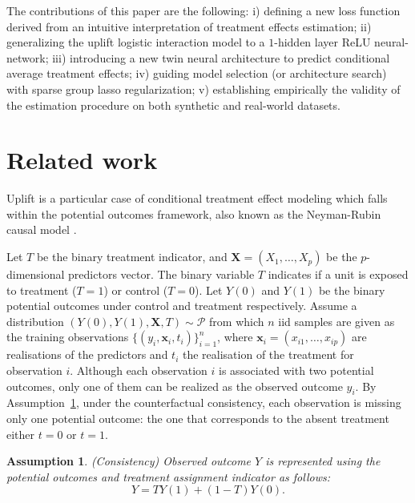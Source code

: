 \documentclass{article}
\def\x{\mathbf x}
\newtheorem{assumption}{Assumption}
\begin{document}
The contributions of this paper are the following: i) defining a new loss function derived from an intuitive interpretation of treatment effects estimation; ii) generalizing the uplift logistic interaction model to a $1$-hidden layer ReLU neural-network; iii) introducing a new twin neural architecture to predict conditional average treatment effects;  iv) guiding model selection (or architecture search) with sparse group lasso regularization; v) establishing empirically the validity of the estimation procedure on both synthetic and real-world datasets. %




\section{Related work}
\label{sec:notation}


Uplift is a particular case of conditional treatment effect modeling which falls within the potential outcomes framework, also known as the Neyman-Rubin causal model \citep{rubin1974estimating,rosenbaum1983central,holland1986statistics}.

Let $T$ be the binary  treatment indicator, and $\boldsymbol X = (X_1,\ldots,X_p)$ be the $p$-dimensional predictors vector. The binary variable $T$ indicates if a unit is exposed to treatment ($T=1$) or control ($T=0$). Let $Y(0)$  and $Y(1)$ be the binary potential outcomes under control and treatment respectively. Assume a distribution $(Y(0),Y(1),\boldsymbol X,T) \sim \mathcal{P}$ from which $n$ iid samples are given as the training observations $\{(y_i, \textbf{x}_i, t_i)\}_{i=1}^n$, where $\x_i = (x_{i1}, \ldots, x_{ip})$ are realisations of the predictors and $t_i$ the realisation of the treatment for observation $i$. Although each observation $i$ is associated with two potential outcomes, only one of them can be realized as the observed outcome $y_i$. By Assumption~\ref{ass:assumption3}, under the counterfactual consistency, each observation is missing only one potential outcome: the one that corresponds to the absent treatment either $t=0$ or $t=1$.\\

\begin{assumption}
(Consistency) Observed outcome $Y$ is represented using the potential outcomes and treatment assignment indicator as follows:
$$Y=TY(1) + (1-T)Y(0).$$
\label{ass:assumption3}
\end{assumption}
\end{document}

